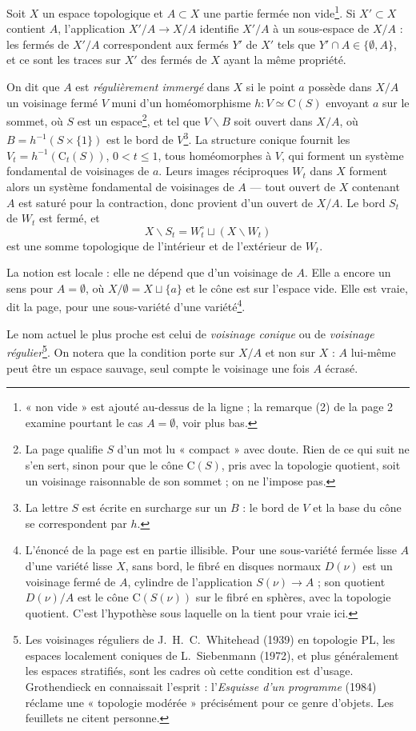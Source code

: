 \documentclass[11pt,a4paper]{article}
\begin{document}
Soit $X$ un espace topologique et $A \subset X$ une partie fermée non
vide\footnote{« non vide » est ajouté au-dessus de la ligne ; la remarque (2) de
la page 2 examine pourtant le cas $A = \emptyset$, voir plus bas.}. Si $X'
\subset X$ contient $A$, l'application $X'/A \to X/A$ identifie $X'/A$ à un
sous-espace de $X/A$ : les fermés de $X'/A$ correspondent aux fermés $Y'$ de $X'$
tels que $Y' \cap A \in \{\emptyset, A\}$, et ce sont les traces sur $X'$ des
fermés de $X$ ayant la même propriété.

On dit que $A$ est \emph{régulièrement immergé} dans $X$ si le point $a$ possède
dans $X/A$ un voisinage fermé $V$ muni d'un homéomorphisme $h : V \simeq
\mathrm{C}(S)$ envoyant $a$ sur le sommet, où $S$ est un espace\footnote{La page
qualifie $S$ d'un mot lu « compact » avec doute. Rien de ce qui suit ne s'en
sert, sinon pour que le cône $\mathrm{C}(S)$, pris avec la topologie quotient,
soit un voisinage raisonnable de son sommet ; on ne l'impose pas.}, et tel que
$V \smallsetminus B$ soit ouvert dans $X/A$, où $B = h^{-1}(S \times \{1\})$ est
le bord de $V$\footnote{La lettre $S$ est écrite en surcharge sur un $B$ : le
bord de $V$ et la base du cône se correspondent par $h$.}. La structure conique
fournit les $V_{t} = h^{-1}(\mathrm{C}_{t}(S))$, $0 < t \leq 1$, tous homéomorphes
à $V$, qui forment un système fondamental de voisinages de $a$. Leurs images
réciproques $W_{t}$ dans $X$ forment alors un système fondamental de voisinages
de $A$ --- tout ouvert de $X$ contenant $A$ est saturé pour la contraction, donc
provient d'un ouvert de $X/A$. Le bord $S_{t}$ de $W_{t}$ est fermé, et
\[
X \smallsetminus S_{t} = W_{t}^{\circ} \sqcup (X \smallsetminus W_{t})
\]
est une somme topologique de l'intérieur et de l'extérieur de $W_{t}$.

La notion est locale : elle ne dépend que d'un voisinage de $A$. Elle a encore un
sens pour $A = \emptyset$, où $X/\emptyset = X \sqcup \{a\}$ et le cône est sur
l'espace vide. Elle est vraie, dit la page, pour une sous-variété d'une
variété\footnote{L'énoncé de la page est en partie illisible. Pour une
sous-variété fermée lisse $A$ d'une variété lisse $X$, sans bord, le fibré en
disques normaux $D(\nu)$ est un voisinage fermé de $A$, cylindre de
l'application $S(\nu) \to A$ ; son quotient $D(\nu)/A$ est le cône
$\mathrm{C}(S(\nu))$ sur le fibré en sphères, avec la topologie quotient. C'est
l'hypothèse sous laquelle on la tient pour vraie ici.}.

Le nom actuel le plus proche est celui de \emph{voisinage conique} ou de
\emph{voisinage régulier}\footnote{Les voisinages réguliers de J.~H.~C.~Whitehead
(1939) en topologie PL, les espaces localement coniques de L.~Siebenmann (1972),
et plus généralement les espaces stratifiés, sont les cadres où cette condition
est d'usage. Grothendieck en connaissait l'esprit : l'\emph{Esquisse d'un
programme} (1984) réclame une « topologie modérée » précisément pour ce genre
d'objets. Les feuillets ne citent personne.}. On notera que la condition porte
sur $X/A$ et non sur $X$ : $A$ lui-même peut être un espace sauvage, seul compte
le voisinage une fois $A$ écrasé.
\end{document}
